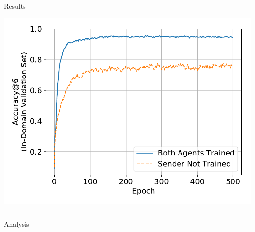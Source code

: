 \documentclass[final]{beamer}
\newlength{\onecolwid}
\newlength{\twocolwid}
\begin{document}
\begin{frame}[t]
\begin{columns}[t]
\begin{column}{\twocolwid}
\begin{block}{Results}
\begin{minipage}{.3\textwidth}
  \includegraphics[width=\textwidth]{figures/sender_not_trained}
\end{minipage}

\vspace{5mm}


\end{block}

\begin{columns}[t,totalwidth=\twocolwid] %

\begin{column}{\onecolwid} %



\begin{block}{Analysis}

\end{block}


\end{column} %

\begin{column}{\onecolwid} %


\end{column}
\end{columns}
\end{column}
\end{columns}
\end{frame}
\end{document}
